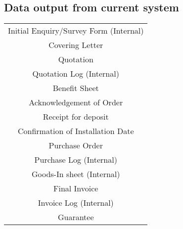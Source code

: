 \begin{appendices}
	\section{Data output from current system}
\begin{tabular}{ | c | }
	\hline
Initial Enquiry/Survey Form (Internal)\\
Covering Letter\\
Quotation\\
Quotation Log (Internal)\\
Benefit Sheet\\
Acknowledgement of Order\\
Receipt for deposit\\
Confirmation of Installation Date\\
Purchase Order\\
Purchase Log (Internal)\\
Goods-In sheet (Internal)\\
Final Invoice\\
Invoice Log (Internal)\\
Guarantee\\
\hline
\end{tabular}

\end{appendices}
